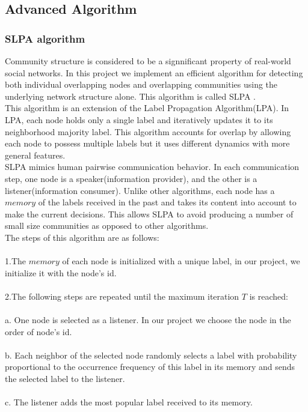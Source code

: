 \documentclass{article}
\begin{document}
\subsection{Advanced Algorithm}
\subsubsection{SLPA algorithm}
Community structure is considered to be a signnificant property of real-world social networks. In this project we implement an efficient algorithm for detecting both individual overlapping nodes and overlapping communities using the underlying network structure alone. This algorithm is called SLPA \cite{cite:SLPA}.\\
This algorithm is an extension of the Label Propagation Algorithm(LPA). In LPA, each node holds only a single label and iteratively updates it to its neighborhood majority label. This algorithm accounts for overlap by allowing each node to possess multiple labels but it uses different dynamics with more general features.\\
SLPA mimics human pairwise communication behavior. In each communication step, one node is a speaker(information provider), and the other is a listener(information consumer). Unlike other algorithms, each node has a $memory$ of the labels received in the past and takes its content into account to make the current decisions. This allows SLPA to avoid producing a number of small size communities as opposed to other algorithms.\\
The steps of this algorithm are as follows:\\\\
1.The $memory$ of each node is initialized with a unique label, in our project, we initialize it with the node's id.\\\\
2.The following steps are repeated until the maximum iteration $T$ is reached:\\\\
a. One node is selected as a listener. In our project we choose the node in the order of node's id.\\\\
b. Each neighbor of the selected node randomly selects a label with probability proportional to the occurrence frequency of this label in its memory and sends the selected label to the listener.\\\\
c. The listener adds the most popular label received to its memory.\\\\
\end{document}
